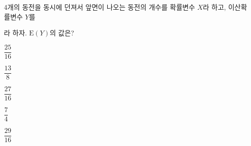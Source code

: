 4개의 동전을 동시에 던져서 앞면이 나오는 동전의 개수를 확률변수 $X$라 하고, 이산확률변수 $Y$를 \par\smallskip{}\par\smallskip\noindent 라 하자. $\mathrm{E}(Y)$의 값은?
\begin{choices32}{\rule[-3ex]{0pt}{8ex}$\dfrac{25}{16}$}{\rule[-3ex]{0pt}{8ex}$\dfrac{13}{8}$}{\rule[-3ex]{0pt}{8ex}$\dfrac{27}{16}$}{\rule[-3ex]{0pt}{8ex}$\dfrac{7}{4}$}{\rule[-3ex]{0pt}{8ex}$\dfrac{29}{16}$}\end{choices32}
